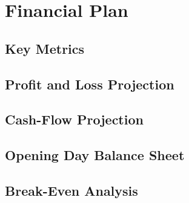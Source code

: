{\let\cleardoublepage\relax \chapter{Financial Plan}}

\section{Key Metrics}

\section{Profit and Loss Projection}

\section{Cash-Flow Projection}

\section{Opening Day Balance Sheet}

\section{Break-Even Analysis}

